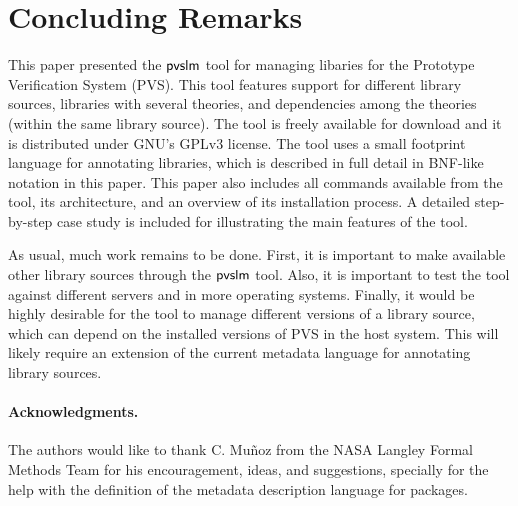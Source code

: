 \section{Concluding Remarks}
\label{sec.concl}

This paper presented the $\textsf{pvslm}$ tool for managing libaries for the
Prototype Verification System (PVS). This tool features support for
different library sources, libraries with several theories, and
dependencies among the theories (within the same library source).  The
tool is freely available for download and it is distributed under
GNU's GPLv3 license. The tool uses a small footprint language for
annotating libraries, which is described in full detail in BNF-like
notation in this paper. This paper also includes all commands
available from the tool, its architecture, and an overview of its
installation process.  A detailed step-by-step case study is included
for illustrating the main features of the tool.

As usual, much work remains to be done. First, it is important to make
available other library sources through the $\textsf{pvslm}$ tool.  Also, it
is important to test the tool against different servers and in more
operating systems. Finally, it would be highly desirable for the tool
to manage different versions of a library source, which can depend on
the installed versions of PVS in the host system. This will likely
require an extension of the current metadata language for annotating
library sources.

\paragraph{\bf Acknowledgments.} The authors would like to thank
C. Mu\~noz from the NASA Langley Formal Methods Team for his
encouragement, ideas, and suggestions, specially for the help with the
definition of the metadata description language for packages.

